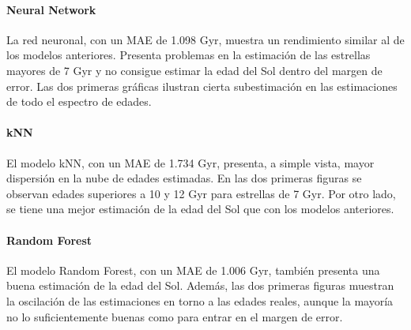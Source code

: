 \paragraph{Neural Network} 
La red neuronal, con un MAE de 1.098 Gyr, muestra un rendimiento similar al de los modelos anteriores. Presenta problemas en la estimación de las estrellas mayores de 7 Gyr y no consigue estimar la edad del Sol dentro del margen de error. Las dos primeras gráficas ilustran cierta subestimación en las estimaciones de todo el espectro de edades.

\paragraph{kNN} 
El modelo kNN, con un MAE de 1.734 Gyr, presenta, a simple vista, mayor dispersión en la nube de edades estimadas. En las dos primeras figuras se observan edades superiores a 10 y 12 Gyr para estrellas de 7 Gyr. Por otro lado, se tiene una mejor estimación de la edad del Sol que con los modelos anteriores.

\paragraph{Random Forest} 
El modelo Random Forest, con un MAE de 1.006 Gyr, también presenta una buena estimación de la edad del Sol. Además, las dos primeras figuras muestran la oscilación de las estimaciones en torno a las edades reales, aunque la mayoría no lo suficientemente buenas como para entrar en el margen de error.

